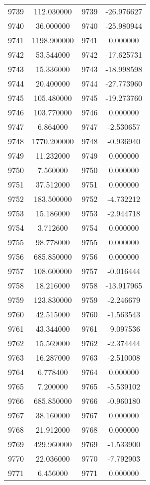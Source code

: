 \documentclass[12pt]{article}
\begin{document}
\begin{longtable}{@{}cccc@{}}
9739 & 112.030000 & 9739 & -26.976627 \\
9740 & 36.000000 & 9740 & -25.980944 \\
9741 & 1198.900000 & 9741 & 0.000000 \\
9742 & 53.544000 & 9742 & -17.625731 \\
9743 & 15.336000 & 9743 & -18.998598 \\
9744 & 20.400000 & 9744 & -27.773960 \\
9745 & 105.480000 & 9745 & -19.273760 \\
9746 & 103.770000 & 9746 & 0.000000 \\
9747 & 6.864000 & 9747 & -2.530657 \\
9748 & 1770.200000 & 9748 & -0.936940 \\
9749 & 11.232000 & 9749 & 0.000000 \\
9750 & 7.560000 & 9750 & 0.000000 \\
9751 & 37.512000 & 9751 & 0.000000 \\
9752 & 183.500000 & 9752 & -4.732212 \\
9753 & 15.186000 & 9753 & -2.944718 \\
9754 & 3.712600 & 9754 & 0.000000 \\
9755 & 98.778000 & 9755 & 0.000000 \\
9756 & 685.850000 & 9756 & 0.000000 \\
9757 & 108.600000 & 9757 & -0.016444 \\
9758 & 18.216000 & 9758 & -13.917965 \\
9759 & 123.830000 & 9759 & -2.246679 \\
9760 & 42.515000 & 9760 & -1.563543 \\
9761 & 43.344000 & 9761 & -9.097536 \\
9762 & 15.569000 & 9762 & -2.374444 \\
9763 & 16.287000 & 9763 & -2.510008 \\
9764 & 6.778400 & 9764 & 0.000000 \\
9765 & 7.200000 & 9765 & -5.539102 \\
9766 & 685.850000 & 9766 & -0.960180 \\
9767 & 38.160000 & 9767 & 0.000000 \\
9768 & 21.912000 & 9768 & 0.000000 \\
9769 & 429.960000 & 9769 & -1.533900 \\
9770 & 22.036000 & 9770 & -7.792903 \\
9771 & 6.456000 & 9771 & 0.000000 \\

\end{longtable}
\end{document}
